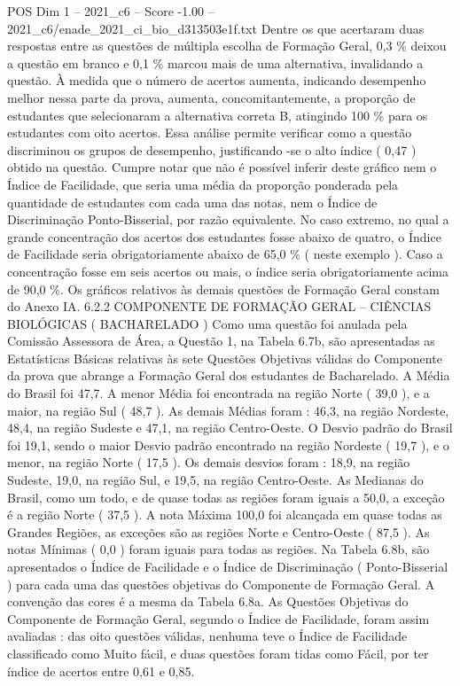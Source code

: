\begin{textsample}{POS Dim 1 – 2021\_c6 – Score -1.00 – 2021\_c6/enade\_2021\_ci\_bio\_d313503e1f.txt}
Dentre os que acertaram duas respostas entre as questões de múltipla escolha de Formação Geral, 0,3 \% deixou a questão em branco e 0,1 \% marcou mais de uma alternativa, invalidando a questão.
À medida que o número de acertos aumenta, indicando desempenho melhor nessa parte da prova, aumenta, concomitantemente, a proporção de estudantes que selecionaram a alternativa correta B, atingindo 100 \% para os estudantes com oito acertos.
Essa análise permite verificar como a questão discriminou os grupos de desempenho, justificando -se o alto índice ( 0,47 ) obtido na questão.
Cumpre notar que não é possível inferir deste gráfico nem o Índice de Facilidade, que seria uma média da proporção ponderada pela quantidade de estudantes com cada uma das notas, nem o Índice de Discriminação Ponto-Bisserial, por razão equivalente.
No caso extremo, no qual a grande concentração dos acertos dos estudantes fosse abaixo de quatro, o Índice de Facilidade seria obrigatoriamente abaixo de 65,0 \% ( neste exemplo ).
Caso a concentração fosse em seis acertos ou mais, o índice seria obrigatoriamente acima de 90,0 \%.
Os gráficos relativos às demais questões de Formação Geral constam do Anexo IA. 6.2.2 COMPONENTE DE FORMAÇÃO GERAL – CIÊNCIAS BIOLÓGICAS ( BACHARELADO ) Como uma questão foi anulada pela Comissão Assessora de Área, a Questão 1, na Tabela 6.7b, são apresentadas as Estatísticas Básicas relativas às sete Questões Objetivas válidas do Componente da prova que abrange a Formação Geral dos estudantes de Bacharelado.
A Média do Brasil foi 47,7.
A menor Média foi encontrada na região Norte ( 39,0 ), e a maior, na região Sul ( 48,7 ).
As demais Médias foram : 46,3, na região Nordeste, 48,4, na região Sudeste e 47,1, na região Centro-Oeste.
O Desvio padrão do Brasil foi 19,1, sendo o maior Desvio padrão encontrado na região Nordeste ( 19,7 ), e o menor, na região Norte ( 17,5 ).
Os demais desvios foram : 18,9, na região Sudeste, 19,0, na região Sul, e 19,5, na região Centro-Oeste.
As Medianas do Brasil, como um todo, e de quase todas as regiões foram iguais a 50,0, a exceção é a região Norte ( 37,5 ).
A nota Máxima 100,0 foi alcançada em quase todas as Grandes Regiões, as exceções são as regiões Norte e Centro-Oeste ( 87,5 ).
As notas Mínimas ( 0,0 ) foram iguais para todas as regiões.
Na Tabela 6.8b, são apresentados o Índice de Facilidade e o Índice de Discriminação ( Ponto-Bisserial ) para cada uma das questões objetivas do Componente de Formação Geral.
A convenção das cores é a mesma da Tabela 6.8a.
As Questões Objetivas do Componente de Formação Geral, segundo o Índice de Facilidade, foram assim avaliadas : das oito questões válidas, nenhuma teve o Índice de Facilidade classificado como Muito fácil, e duas questões foram tidas como Fácil, por ter índice de acertos entre 0,61 e 0,85.

\end{textsample}
